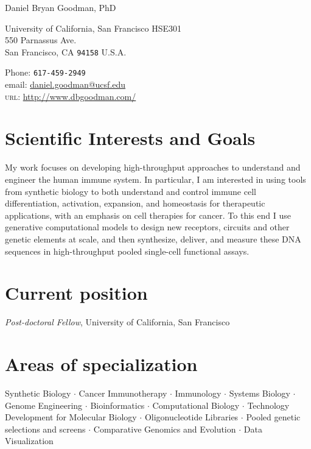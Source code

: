 \documentclass[11pt, letterpaper]{article}
\newcommand{\cd}{$\cdot${ }}
\begin{document}
\textsf{\huge Daniel Bryan Goodman, PhD}\\[0cm]
\begin{multicols}{2}
University of California, San Francisco
HSE301\\
550 Parnassus Ave.\\
San Francisco, CA \texttt{94158}
U.S.A.\\[0cm]

\columnbreak

Phone: \texttt{617-459-2949}\\
email: \href{mailto:daniel.goodman@ucsf.edu}{daniel.goodman@ucsf.edu}\\
\textsc{url}: \href{http://www.dbgoodman.com/}{http://www.dbgoodman.com/}\\
\end{multicols}

\section*{Scientific Interests and Goals}

My work focuses on developing high-throughput approaches to understand and engineer the human immune system. In particular, I am interested in using tools from synthetic biology to both understand and control immune cell differentiation, activation, expansion, and homeostasis for therapeutic applications, with an emphasis on cell therapies for cancer. To this end I use generative computational models to design new receptors, circuits and other genetic elements at scale, and then synthesize, deliver, and measure  these DNA sequences in high-throughput pooled single-cell functional assays.

\section*{Current position}
\emph{Post-doctoral Fellow}, University of California, San Francisco
 
\section*{Areas of specialization}
\nohyphens{
Synthetic Biology \cd Cancer Immunotherapy \cd Immunology  \cd Systems Biology \cd Genome Engineering \cd Bioinformatics \cd Computational Biology \cd Technology Development for Molecular Biology \cd Oligonucleotide Libraries \cd Pooled genetic selections and screens \cd Comparative Genomics and Evolution \cd Data Visualization }
\end{document}
